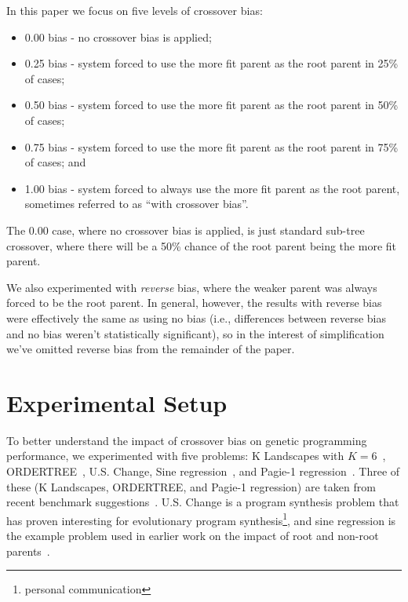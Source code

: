 \documentclass{sig-alternate}
\begin{document}
In this paper we focus on five levels of crossover bias:
\begin{itemize}
\item 0.00 bias - no crossover bias is applied;
\item 0.25 bias - system forced to use the more fit parent as the root parent in 25\% of cases;
\item 0.50 bias - system forced to use the more fit parent as the root parent in 50\% of cases;
\item 0.75 bias - system forced to use the more fit parent as the root parent in 75\% of cases; and
\item 1.00 bias - system forced to always use the more fit parent as the root parent, sometimes referred to as ``with crossover bias''.
\end{itemize}
The 0.00 case, where no crossover bias is applied, is just standard sub-tree crossover, where there will be a 50\% chance of the root parent being the more fit parent.

We also experimented with \emph{reverse} bias, where the weaker parent was always forced to be 
the root parent. In general, however, the results with reverse bias were effectively the same as using 
no bias (i.e., differences between reverse bias and no bias weren't statistically significant), so in the 
interest of simplification we've omitted reverse bias from the remainder of the paper.

\section{Experimental Setup} \label{sec:Experiments}

To better understand the impact of crossover bias on genetic programming performance, we 
experimented with five problems: K Landscapes with $K=6$~\cite{vanneschi2011k}, 
ORDER\-TREE~\cite{hoang2006ordertree}, U.S. Change, Sine regression~\cite{poli08:fieldguide}, 
and Pagie-1 regression~\cite{pagie1997evolutionary}.
Three of these (K Landscapes, ORDERTREE, and Pagie-1 regression) are taken from recent benchmark 
suggestions~\cite{gp-benchmarks-2013}. U.S. Change is a program synthesis problem  that has proven 
interesting for evolutionary program synthesis\footnote{personal communication}, and sine regression 
is the example problem used in earlier work on the impact of root and non-root 
parents~\cite{McPheeDonatucciDramdahl:2014}. 
\end{document}
